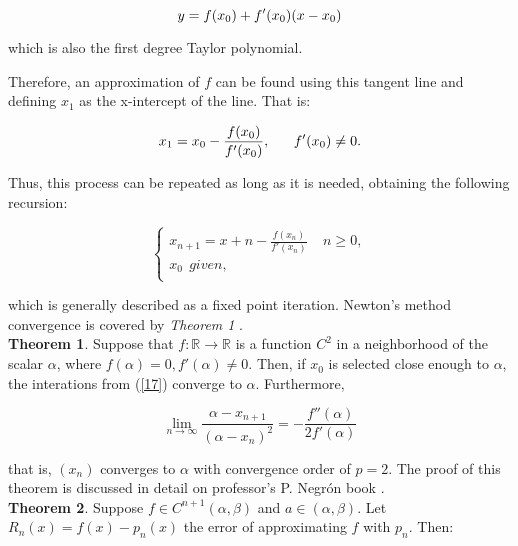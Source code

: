 \documentclass{article}
\begin{document}
    \begin{equation}\label{15}
        y = f(x_0) + f'(x_0)(x-x_0) \\
    \end{equation}
    
which is also the first degree Taylor polynomial.
 
\newpage

Therefore, an approximation of $f$ can be found using this tangent line and defining $x_1$ as the x-intercept of the line. That is:

    \begin{equation}\label{16}
        x_1 = x_0 - \frac{f(x_0)}{f'(x_0)}, \ \ \ \ \ f'(x_0) \neq 0. \\
    \end{equation}

Thus, this process can be repeated as long as it is needed, obtaining the following recursion:

    \begin{equation}\label{17}
        \begin{cases}
            x_{n+1} = x+n - \frac{f(x_n)}{f'(x_n)} \ \ \ \ \ n \geq 0,  \\
            x_0 \ \ given, \\
        \end{cases}
    \end{equation}

which is generally described as a fixed point iteration. Newton's method convergence is covered by \textit{Theorem 1} \cite{Numerico}. \\

\noindent \textbf{Theorem 1}. Suppose that $f : \mathbb{R} \rightarrow \mathbb{R}$ is a function $C^2$ in a neighborhood of the scalar $\alpha$, where $f(\alpha) = 0, f'(\alpha) \neq 0.$ Then, if $x_0$ is selected close enough to $\alpha$, the interations from (\ref{17}) converge to $\alpha$. Furthermore,

    \begin{equation}\label{18}
        \lim_{n\to\infty} \frac{\alpha - x_{n+1}}{(\alpha - x_n)^2} = - \frac{f''(\alpha)}{2f'(\alpha)}
    \end{equation}

\noindent that is, $(x_n)$ converges to $\alpha$ with convergence order of $p = 2$. The proof of this theorem is discussed in detail on professor's P. Negr\'{o}n book \cite{Numerico}. \\

\noindent \textbf{Theorem 2}. Suppose $f \in C^{n+1}(\alpha, \beta)$ and $a \in (\alpha,\beta)$. Let $R_n (x) = f(x) - p_n(x)$ the error of approximating $f$ with $p_n$. Then:
\end{document}
